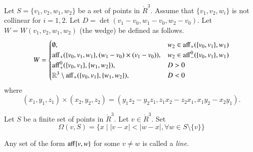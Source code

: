 \begin{tarskidata}
\begin{tarski}

\begin{definition}[wedge,~W]
Let $S=\{v_1,v_2,w_1,w_2\}$ be a set of points in
$\ring{R}^3$.  Assume that $\{v_1,v_2,w_i\}$ is not collinear
for $i=1,2$. Let $D = \det(v_1-v_0,w_1-v_0,w_2-v_0)$.  
Let $W = W(v_1,v_2,w_1,w_2)$ (the wedge) be defined
as follows.  
$$
W=\begin{cases}
\emptyset,& w_2\in {\operatorname{aff}}_+(\{v_0,v_1\},w_1)\\
{\operatorname{aff}}_+(\{v_0,v_1,w_1\},(w_1-v_0)\times (v_1-v_0)),&
    w_2\in{\operatorname{aff}}_-^0(\{v_0,v_1\},w_1)\\
{\operatorname{aff}}_+^0(\{v_0,v_1\},\{w_1,w_2\}),& D > 0\\
\mathbb{R}^3\setminus{\operatorname{aff}}_+(\{v_0,v_1\},\{w_1,w_2\}),& D < 0\\
\end{cases}
$$
where 
$$
(x_1,y_1,z_1)\times (x_2,y_2,z_2) = 
(y_1 z_2 - y_2 z_1, z_1 x_2 - z_2 x_1, x_1 y_2 - x_2 y_1).
$$
\end{definition}
\end{tarski}

\begin{tarski}

\begin{definition} 
Let $S$ be a finite set of points in 
$\ring{R}^3$.  Let $v\in\ring{R}^3$. Set
  $$
  \Omega(v,S) = \{x \mid |v-x| < |w-x|, \forall w\in S\setminus\{v\}\}
  $$
\end{definition}
\end{tarski}
	
\begin{tarski}

\begin{definition}[line]
Any set of the form ${\operatorname{aff}}\{v,w\}$ for some $v\ne w$ is called a 
 {\it line.}
\end{definition}
\end{tarski}

\begin{tarski}


\end{tarski}
\end{tarskidata}
